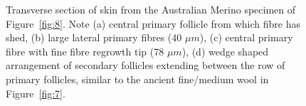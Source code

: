 

%

\begin{figure}[p]
  \centering
      \caption{ Transverse section of skin from the Australian Merino specimen
      of Figure~\ref{fig:8}.  Note (a) central primary follicle from which fibre
      has shed, (b) large lateral primary fibres (40 $\mu m$), (c) central
      primary fibre with fine fibre regrowth tip (78 $\mu m$), (d) wedge shaped
      arrangement of secondary follicles extending between the row of primary
      follicles, similar to the ancient fine/medium wool in Figure~\ref{fig:7}.}
  \label{fig:9}
\end{figure}

%
